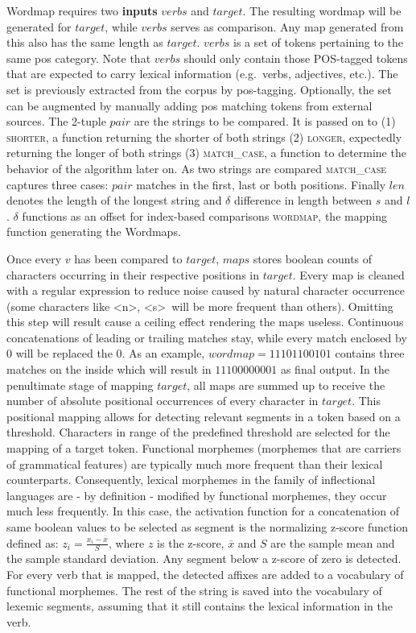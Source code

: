 Wordmap requires two \textbf{inputs} $verbs$ and $target$.
The resulting wordmap will be generated for $target$, while $verbs$ serves as comparison.
Any map generated from this also has the same length as $target$.
$verbs$ is a set of tokens pertaining to the same \ac{pos} category.
Note that $verbs$ should only contain those POS-tagged tokens that are expected to carry lexical information (e.g.\ verbs, adjectives, etc.).
The set is previously extracted from the corpus by \ac{pos}\hyphen tagging.
Optionally, the set can be augmented by manually adding \ac{pos} matching tokens from external sources.
The 2-tuple $pair$ are the strings to be compared.
It is passed on to (1) \textsc{shorter}, a function returning the shorter of both strings (2) \textsc{longer}, expectedly returning the longer of both strings (3) \textsc{match\_case}, a function to determine the behavior of the algorithm later on.
As two strings are compared \textsc{match\_case} captures three cases: $pair$ matches in the first, last or both positions.
Finally $len$ denotes the length of the longest string and $\delta$ difference in length between $s$ and $l$.
$\delta$ functions as an offset for index-based comparisons \textsc{wordmap}, the mapping function generating the Wordmaps.

Once every $v$ has been compared to $target$, $maps$ stores boolean counts of characters occurring in their respective positions in $target$.
Every map is cleaned with a regular expression to reduce noise caused by natural character occurrence (some characters like \textless n\textgreater, \textless s\textgreater ~will be more frequent than others).
Omitting this step will result cause a ceiling effect rendering the maps useless.
Continuous concatenations of leading or trailing matches stay, while every match enclosed by $0$ will be replaced the $0$.
As an example, $wordmap = 11101100101$ contains three matches on the inside which will result in $11100000001$ as final output.
In the penultimate stage of mapping $target$, all maps are summed up to receive the number of absolute positional occurrences of every character in $target$.
This positional mapping allows for detecting relevant segments in a token based on a threshold.
Characters in range of the predefined threshold are selected for the mapping of a target token.
Functional morphemes (morphemes that are carriers of grammatical features) are typically much more frequent than their lexical counterparts.
Consequently, lexical morphemes in the family of inflectional languages are - by definition - modified by functional morphemes, they occur much less frequently.
In this case, the activation function for a concatenation of same boolean values to be selected as segment is the normalizing z-score function defined as: $z_{i} = \frac{x_{i} - \overline{x}}{S}$,
where $z$ is the z-score, $\overline{x}$ and $S$ are the sample mean and the sample standard deviation.
Any segment below a z-score of zero is detected.
For every verb that is mapped, the detected affixes are added to a vocabulary of functional morphemes.
The rest of the string is saved into the vocabulary of lexemic segments, assuming that it still contains the lexical information in the verb.

